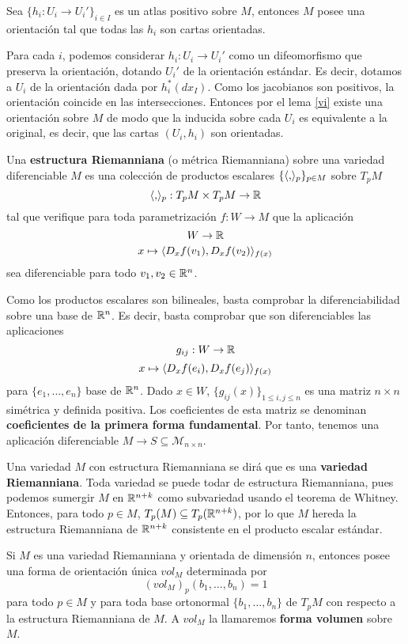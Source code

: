 \documentclass[CV.tex]{subfiles}
\begin{document}
\begin{prop}\label{9.14}
Sea $\{h_i:U_i\to U_i'\}_{i\in I}$ es un atlas positivo sobre $M$, entonces $M$ posee una orientación tal que todas las $h_i$ son cartas orientadas.
\end{prop}
\begin{dem}
Para cada $i$, podemos considerar $h_i:U_i\to U_i'$ como un difeomorfismo que preserva la orientación, dotando $U_i'$ de la orientación estándar. Es decir, dotamos a $U_i$ de la orientación dada por $h_i^*(dx_I)$. Como los jacobianos son positivos, la orientación coincide en las intersecciones. Entonces por el lema \ref{vi} existe una orientación sobre $M$ de modo que la inducida sobre cada $U_i$ es equivalente a la original, es decir, que las cartas $(U_i,h_i)$ son orientadas.
\QED
\end{dem}


\begin{defi}
Una \textbf{estructura Riemanniana} (o métrica Riemanniana) sobre una variedad diferenciable $M$ es una colección de productos escalares $\{\langle{,}\rangle_p\}_{p\in M}$ sobre $T_pM$
\[
\langle{,}\rangle_p:T_pM\times T_pM\to\mathbb{R}
\] 
tal que verifique para toda parametrización $f:W\to M$ que la aplicación
\[
W\to\mathbb{R}
\]
\[
x\mapsto \langle{D_xf(v_1),D_xf(v_2)}\rangle_{f(x)}
\]
sea diferenciable para todo $v_1,v_2\in\mathbb{R}^n$.
\end{defi}

Como los productos escalares son bilineales, basta comprobar la diferenciabilidad sobre una base de $\mathbb{R}^n$.  Es decir, basta comprobar que son diferenciables las aplicaciones
\[
g_{ij}:W\to \mathbb{R}
\]
\[
x\mapsto \langle{D_x f(e_i),D_xf(e_j)}\rangle_{f(x)}
\]
para $\{e_1,\dots, e_n\}$ base de $\mathbb{R}^n$. Dado $x\in W$, $\{g_{ij}(x)\}_{1\leq i,j\leq n}$ es una matriz $n\times n$ simétrica y definida positiva. Los coeficientes de esta matriz se denominan \textbf{coeficientes de la primera forma fundamental}. Por tanto, tenemos una aplicación diferenciable $M\to S\subseteq \mathcal{M}_{n\times n}$.  

Una variedad $M$ con estructura Riemanniana se dirá que es una \textbf{variedad Riemanniana}. Toda variedad se puede todar de estructura Riemanniana, pues podemos sumergir $M$ en $\mathbb{R}^{n+k}$ como subvariedad usando el teorema de Whitney. Entonces, para todo $p\in M$, $T_p(M)\subseteq T_p(\mathbb{R}^{n+k})$, por lo que $M$ hereda la estructura Riemanniana de $\mathbb{R}^{n+k}$ consistente en el producto escalar estándar.


\begin{prop}
Si $M$ es una variedad Riemanniana y orientada de dimensión $n$, entonces posee una forma de orientación única $vol_M$ determinada por
\[
(vol_M)_p(b_1,\dots, b_n)=1
\]
para todo $p\in M$ y para toda base ortonormal $\{b_1,\dots, b_n\}$ de $T_pM$ con respecto a la estructura Riemanniana de $M$. A $vol_M$ la llamaremos \textbf{forma volumen} sobre $M$.
\end{prop}
\end{document}
